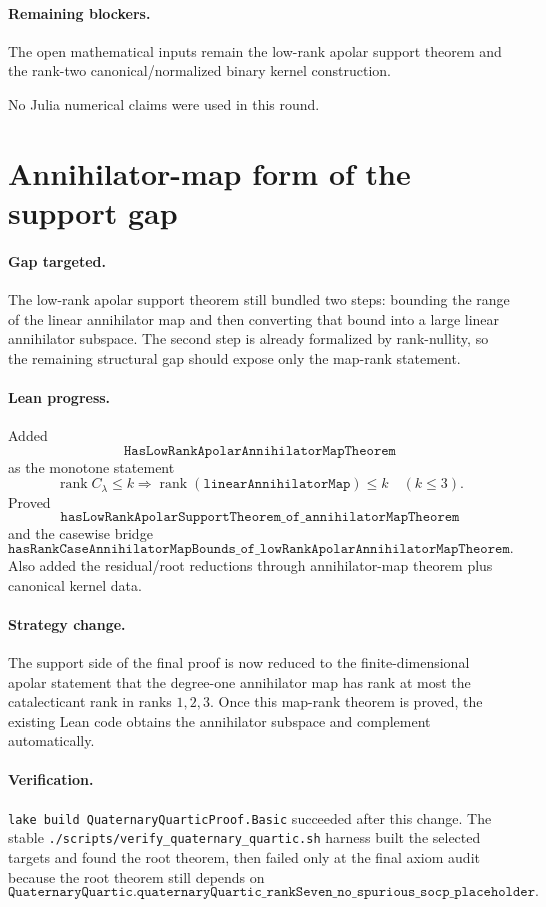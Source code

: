 \documentclass[11pt]{article}
\begin{document}
\paragraph{Remaining blockers.}
The open mathematical inputs remain the low-rank apolar support theorem and the
rank-two canonical/normalized binary kernel construction.

No Julia numerical claims were used in this round.

\section*{Annihilator-map form of the support gap}

\paragraph{Gap targeted.}
The low-rank apolar support theorem still bundled two steps: bounding the range
of the linear annihilator map and then converting that bound into a large
linear annihilator subspace.  The second step is already formalized by
rank-nullity, so the remaining structural gap should expose only the map-rank
statement.

\paragraph{Lean progress.}
Added
\[
\texttt{HasLowRankApolarAnnihilatorMapTheorem}
\]
as the monotone statement
\[
\operatorname{rank} C_\lambda \le k \Longrightarrow
\operatorname{rank}(\texttt{linearAnnihilatorMap}) \le k
\quad (k\le3).
\]
Proved
\[
\texttt{hasLowRankApolarSupportTheorem\_of\_annihilatorMapTheorem}
\]
and the casewise bridge
\[
\texttt{hasRankCaseAnnihilatorMapBounds\_of\_lowRankApolarAnnihilatorMapTheorem}.
\]
Also added the residual/root reductions through annihilator-map theorem plus
canonical kernel data.

\paragraph{Strategy change.}
The support side of the final proof is now reduced to the finite-dimensional
apolar statement that the degree-one annihilator map has rank at most the
catalecticant rank in ranks \(1,2,3\).  Once this map-rank theorem is proved,
the existing Lean code obtains the annihilator subspace and complement
automatically.

\paragraph{Verification.}
\texttt{lake build QuaternaryQuarticProof.Basic} succeeded after this change.
The stable \texttt{./scripts/verify\_quaternary\_quartic.sh} harness built the
selected targets and found the root theorem, then failed only at the final axiom
audit because the root theorem still depends on
\[
\texttt{QuaternaryQuartic.quaternaryQuartic\_rankSeven\_no\_spurious\_socp\_placeholder}.
\]
\end{document}

